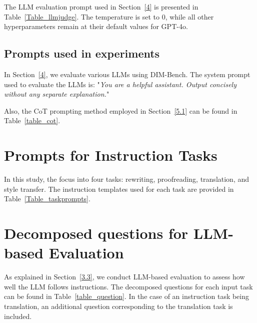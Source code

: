 The LLM evaluation prompt used in Section~\ref{4} is presented in Table~\ref{Table_llmjudge}. 
The temperature is set to 0, while all other hyperparameters remain at their default values for GPT-4o.


\subsection{Prompts used in experiments}

In Section~\ref{4}, we evaluate various LLMs using DIM-Bench.
The system prompt used to evaluate the LLMs is: "\textit{You are a helpful assistant. Output concisely without any separate explanation.}"


Also, the CoT prompting method employed in Section~\ref{5.1} can be found in Table~\ref{table_cot}.




\section{Prompts for Instruction Tasks}
\label{B}

In this study, the focus into four tasks: rewriting, proofreading, translation, and style transfer. The instruction templates used for each task are provided in Table~\ref{Table_taskprompts}.



\section{Decomposed questions for LLM-based Evaluation}
\label{C}
As explained in Section~\ref{3.3}, we conduct LLM-based evaluation to assess how well the LLM follows instructions.
The decomposed questions for each input task can be found in Table~\ref{table_question}.
In the case of an instruction task being translation, an additional question corresponding to the translation task is included.



\clearpage
